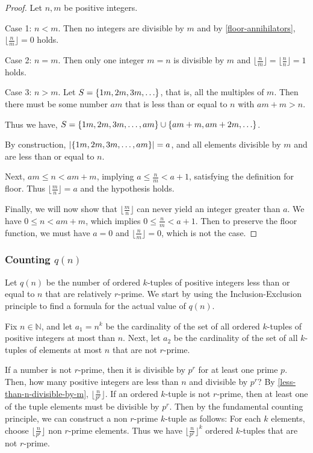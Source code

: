 \documentclass[10pt,a4paper]{article}
\theoremstyle{definition}
\theoremstyle{remark}
\begin{document}
\begin{proof}
	Let \(n,m\) be positive integers.
	
	Case 1: \(n < m\). Then no integers are divisible by \(m\) and by \cref{floor-annihilators}, \(\lfloor\frac{n}{m}\rfloor = 0\) holds.
	
	Case 2: \(n=m\). Then only one integer \(m=n\) is divisible by \(m\) and \(\lfloor\frac{n}{m}\rfloor=\lfloor\frac{n}{n}\rfloor=1 \) holds.
	
	Case 3: \(n>m\). Let \(S=\{1m,2m,3m,\mathellipsis\}\), that is, all the multiples of \(m\). Then there must be some number \(am\) that is less than or equal to \(n\) with \(am+m>n\). 
	
	Thus we have, \(S=\{1m,2m,3m,\mathellipsis ,am\}\cup\{am+m,am+2m,\mathellipsis\}\). 
	
	By construction, \(|\{1m,2m,3m,\mathellipsis ,am\}|=a\), and all elements divisible by \(m\) and are less than or equal to \(n\).
	
	Next, \(am\leq n<am+m\), implying \(a\leq \frac{n}{m}<a+1\), satisfying the definition for floor. Thus \(\lfloor \frac{m}{n}\rfloor=a\) and the hypothesis holds. 
	
	Finally, we will now show that \(\lfloor \frac{m}{n}\rfloor\) can never yield an integer greater than \(a\). We have \(0\leq n < am+m\), which implies \(0\leq \frac{n}{m}<a+1\). Then to preserve the floor function, we must have \(a=0\) and \(\lfloor\frac{n}{m}\rfloor=0\), which is not the case.
\end{proof}

\subsubsection{Counting \texorpdfstring{\(q(n)\)}{}}

Let $q(n)$ be the number of ordered \(k\)-tuples of positive integers less than or equal to $n$ that are relatively $r$-prime. We start by using the Inclusion-Exclusion principle to find a formula for the actual value of $q(n)$.

Fix $n\in \mathbb{N}$, and let $a_1=n^k$ be the cardinality of the set of all ordered $k$-tuples of positive integers at most than $n$. Next, let $a_2$ be the cardinality of the set of all $k$-tuples of elements at most $n$ that are not $r$-prime. 
	
	If a number is not \(r\)-prime, then it is divisible by \(p^r\) for at least one prime \(p\). Then, how many positive integers are less than \(n\) and divisible by \(p^r\)? By \cref{less-than-n-divisible-by-m}, \(\lfloor \frac{n}{p^r}\rfloor\). If an ordered \(k\)-tuple is not \(r\)-prime, then at least one of the tuple elements must be divisible by \(p^r\). Then by the fundamental counting principle, we can construct a non \(r\)-prime \(k\)-tuple as follows: For each \(k\) elements, choose \(\lfloor \frac{n}{p^r}\rfloor\) non \(r\)-prime elements. Thus we have \(\lfloor \frac{n}{p^r}\rfloor^k\) ordered \(k\)-tuples that are not \(r\)-prime. 
	
\end{document}
